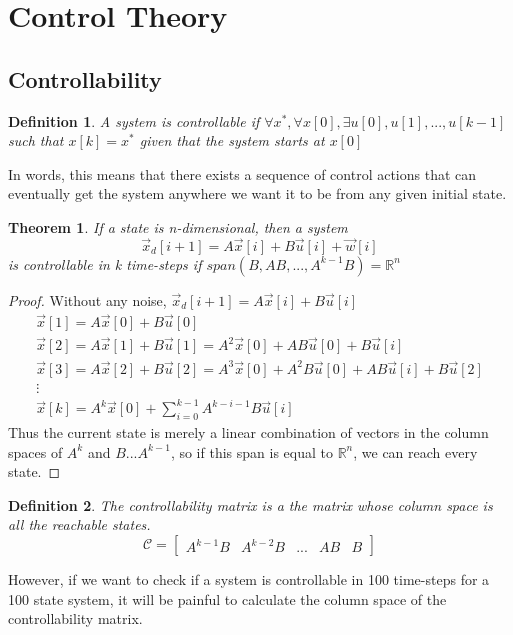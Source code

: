 \documentclass{article}
\newtheorem{theorem}{Theorem}
\newtheorem{definition}{Definition}
\newtheorem{proof}{Proof}
\begin{document}
\section{Control Theory}
\subsection{Controllability}
\begin{definition}
    A system is controllable if $\forall x^*, \forall x[0], \exists u[0],u[1],...,u[k-1]$ such that $x[k]=x^*$ given that the system starts at $x[0]$
\end{definition}
In words, this means that there exists a sequence of control actions that can eventually get the system anywhere we want it to be from any given initial state.
\begin{theorem}
    If a state is n-dimensional, then a system $$\vec{x}_d[i+1]=A\vec{x}[i]+B\vec{u}[i]+\vec{w}[i]$$ 
    is controllable in k time-steps if $span(B, AB, ..., A^{k-1}B)=\mathbb{R}^n$
\end{theorem}
\begin{proof}
    Without any noise, $\vec{x}_d[i+1]=A\vec{x}[i]+B\vec{u}[i]$
    \[
        \begin{array}{c}
            \vec{x}[1]=A\vec{x}[0]+B\vec{u}[0]\\
            \vec{x}[2]=A\vec{x}[1]+B\vec{u}[1] = A^2\vec{x}[0]+AB\vec{u}[0]+B\vec{u}[i]\\
            \vec{x}[3]=A\vec{x}[2]+B\vec{u}[2] = A^3\vec{x}[0]+A^2B\vec{u}[0]+AB\vec{u}[i]+B\vec{u}[2]\\
            \vdots\\
            \vec{x}[k]=A^k\vec{x}[0]+\sum_{i=0}^{k-1}{A^{k-i-1}B\vec{u}[i]}
        \end{array}
        \]
    Thus the current state is merely a linear combination of vectors in the column spaces of $A^k$ and $B...A^{k-1}$, so if this span is equal to $\mathbb{R}^n$, we can reach every state.
\end{proof}
\begin{definition}
    The controllability matrix is a the matrix whose column space is all the reachable states.
    \[
        \mathcal{C} = \left[
            \begin{array}{c|c|c|c|c}
                A^{k-1}B & A^{k-2}B & ... & AB & B
            \end{array}
        \right]
    \]
\end{definition}
However, if we want to check if a system is controllable in 100 time-steps for a 100 state system, it will be painful to calculate the column space of the controllability matrix.
\end{document}
